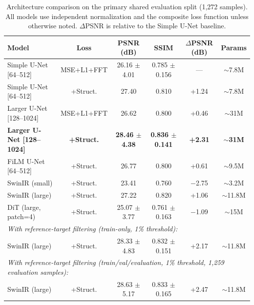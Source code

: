 \documentclass[twocolumn]{aastex631}
\begin{document}
\begin{table}[t]
	\centering
	\caption{Architecture comparison on the primary shared evaluation split (1,272 samples). All models use independent normalization and the composite loss function unless otherwise noted. $\Delta$PSNR is relative to the Simple U-Net baseline.}
	\label{tab:architecture}
	\begin{tabular}{lccccc}
		\toprule
		Model                             & Loss              & PSNR (dB)                 & SSIM                       & $\Delta$PSNR (dB) & Params             \\
		\midrule
		Simple U-Net [64--512]            & MSE+L1+FFT        & 26.16 $\pm$ 4.01          & 0.785 $\pm$ 0.156          & ---               & $\sim$7.8M         \\
		Simple U-Net [64--512]            & +Struct.          & 27.40                     & 0.810                      & +1.24             & $\sim$7.8M         \\
		Larger U-Net [128--1024]          & MSE+L1+FFT        & 26.62                     & 0.800                      & +0.46             & $\sim$31M          \\
		\textbf{Larger U-Net [128--1024]} & \textbf{+Struct.} & \textbf{28.46 $\pm$ 4.38} & \textbf{0.836 $\pm$ 0.141} & \textbf{+2.31}    & $\sim$\textbf{31M} \\
		FiLM U-Net [64--512]              & +Struct.          & 26.77                     & 0.800                      & +0.61             & $\sim$9.5M         \\
		SwinIR (small)                    & +Struct.          & 23.41                     & 0.760                      & $-$2.75           & $\sim$3.2M         \\
		SwinIR (large)                    & +Struct.          & 27.22                     & 0.820                      & +1.06             & $\sim$11.8M        \\
		DiT (large, patch=4)              & +Struct.          & 25.07 $\pm$ 3.77          & 0.761 $\pm$ 0.163          & $-$1.09           & $\sim$15M          \\
		\midrule
		\multicolumn{6}{l}{\textit{With reference-target filtering (train-only, 1\% threshold):}}                                                                                    \\
		SwinIR (large)                    & +Struct.          & 28.33 $\pm$ 4.83          & 0.832 $\pm$ 0.151          & +2.17             & $\sim$11.8M        \\
		\midrule
		\multicolumn{6}{l}{\textit{With reference-target filtering (train/val/evaluation, 1\% threshold, 1,259 evaluation samples):}}                                                \\
		SwinIR (large)                    & +Struct.          & 28.63 $\pm$ 5.17          & 0.833 $\pm$ 0.165          & +2.47             & $\sim$11.8M        \\
		\bottomrule
	\end{tabular}
\end{table}
\end{document}
